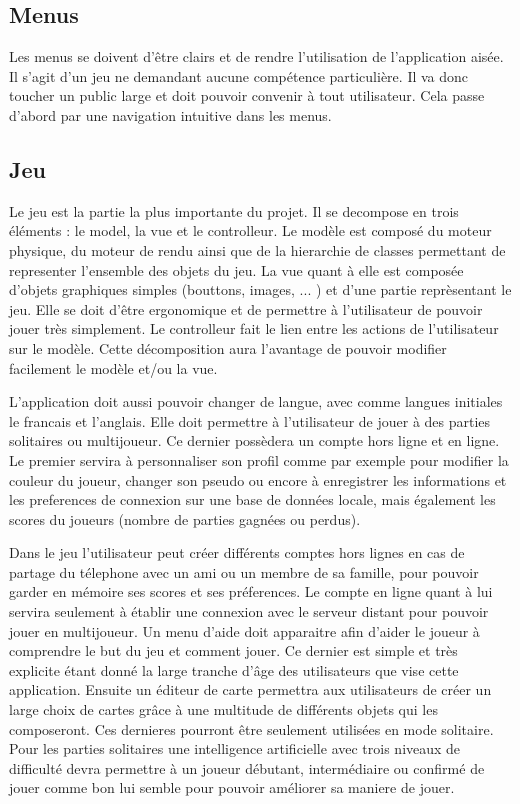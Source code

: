 \subsection{Menus}
		
	Les menus se doivent d'être clairs et de rendre l'utilisation de
	l'application aisée. Il s'agit d'un jeu ne demandant aucune compétence
	particulière. Il va donc toucher un public large et doit pouvoir convenir à
	tout utilisateur. Cela passe d'abord par une navigation intuitive dans les
	menus.
		
\subsection{Jeu}
		
	Le jeu est la partie la plus importante du projet. 
	Il se decompose en trois éléments : le model, la vue et le controlleur. 
	Le modèle est composé du moteur physique, du moteur de rendu ainsi que de la
	hierarchie de classes permettant de representer l'ensemble des objets du jeu. 
	La vue quant à elle est composée d'objets graphiques simples (bouttons, images, ... ) 
	et d'une partie reprèsentant le jeu. Elle se doit d'être ergonomique et de permettre
	à l'utilisateur de pouvoir jouer très simplement. Le controlleur fait
	le lien entre les actions de l'utilisateur sur le modèle. Cette décomposition aura
	l'avantage de pouvoir modifier facilement le modèle et/ou la vue.
		
	L'application doit aussi pouvoir changer de langue, avec comme langues initiales le francais et l'anglais.
	Elle doit permettre à l'utilisateur de jouer à des parties solitaires ou multijoueur. 
	Ce dernier possèdera un compte hors ligne et en ligne.		
	Le premier servira à personnaliser son profil comme par exemple pour modifier
	la couleur du joueur, changer son pseudo ou encore à enregistrer les informations
	et les preferences de connexion sur une base de données locale,
	mais également les scores du joueurs (nombre de parties gagnées ou perdus).
	
	Dans le jeu l'utilisateur peut créer différents comptes hors lignes en cas de partage du télephone
	avec un ami ou un membre de sa famille, pour pouvoir garder en mémoire ses scores et ses préferences.		
	Le compte en ligne quant à lui servira seulement à établir une connexion avec le serveur distant pour pouvoir jouer en multijoueur.		
	Un menu d'aide doit apparaitre afin d'aider le joueur à comprendre le but du jeu et comment jouer. 
	Ce dernier est simple et très explicite étant donné la large tranche d'âge des utilisateurs que vise cette application.		
	Ensuite un éditeur de carte permettra aux utilisateurs de créer un large choix de cartes
	grâce à une multitude de différents objets qui les composeront. Ces dernieres pourront être seulement utilisées en mode solitaire.
	Pour les parties solitaires une intelligence artificielle avec trois niveaux de difficulté 
	devra permettre à un joueur débutant, intermédiaire ou confirmé de jouer comme bon lui semble pour pouvoir améliorer sa maniere de jouer.
	
